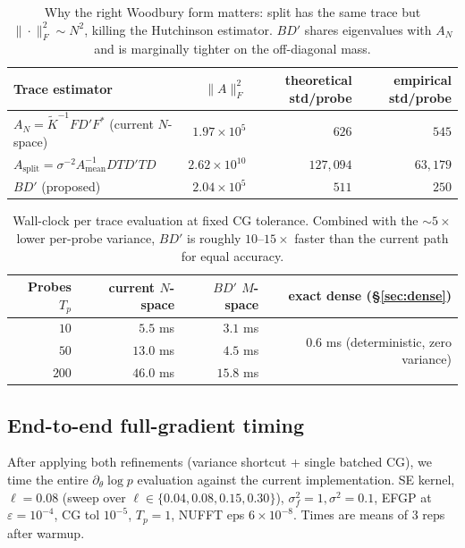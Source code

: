 \documentclass[11pt]{article}
\newcommand{\Ktil}{\widetilde K}
\begin{document}
\begin{table}[h]
\centering
\begin{tabular}{lrrr}
\toprule
Trace estimator & $\|A\|_F^2$ & theoretical std/probe & empirical std/probe \\
\midrule
$A_N = \Ktil^{-1}FD'F^*$ (current $N$-space)          & $1.97\!\times\!10^5$ & $626$ & $545$ \\
$A_{\text{split}} = \sigma^{-2} A_{\text{mean}}^{-1} DTD'TD$ & $2.62\!\times\!10^{10}$ & $127{,}094$ & $63{,}179$ \\
$B D'$ (proposed)                                     & $2.04\!\times\!10^5$ & $511$ & $250$ \\
\bottomrule
\end{tabular}
\caption{Why the right Woodbury form matters: split has the same trace but $\|\!\cdot\!\|_F^2 \sim N^2$, killing the Hutchinson estimator. $BD'$ shares eigenvalues with $A_N$ and is marginally tighter on the off-diagonal mass.}
\end{table}

\begin{table}[h]
\centering
\begin{tabular}{rrrr}
\toprule
Probes $T_p$ & current $N$-space & $BD'$ $M$-space & exact dense (\S\ref{sec:dense}) \\
\midrule
$10$   & $5.5$ ms  & $3.1$ ms & \multirow{3}{*}{$0.6$ ms (deterministic, zero variance)} \\
$50$   & $13.0$ ms & $4.5$ ms & \\
$200$  & $46.0$ ms & $15.8$ ms & \\
\bottomrule
\end{tabular}
\caption{Wall-clock per trace evaluation at fixed CG tolerance. Combined with the $\sim\!5\times$ lower per-probe variance, $BD'$ is roughly $10$--$15\times$ faster than the current path for equal accuracy.}
\end{table}

\subsection{End-to-end full-gradient timing}

After applying both refinements (variance shortcut + single batched CG), we time the entire $\partial_\theta \log p$ evaluation against the current implementation. SE kernel, $\ell=0.08$ (sweep over $\ell\in\{0.04,0.08,0.15,0.30\}$), $\sigma_f^2=1, \sigma^2=0.1$, EFGP at $\varepsilon=10^{-4}$, CG tol $10^{-5}$, $T_p=1$, NUFFT eps $6\!\times\!10^{-8}$. Times are means of 3 reps after warmup.
\end{document}
